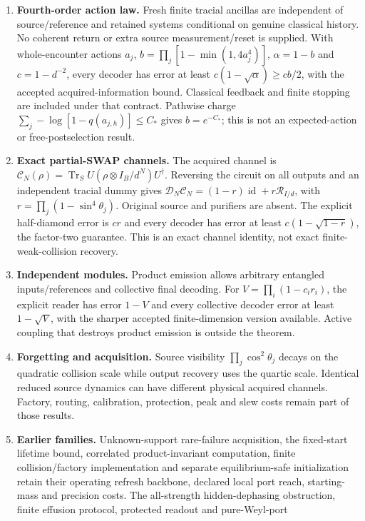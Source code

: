 \documentclass[11pt]{article}
\newcommand{\Tr}{\operatorname{Tr}}
\newcommand{\id}{\operatorname{id}}
\begin{document}
\begin{enumerate}
\item \textbf{Fourth-order action law.} Fresh finite tracial ancillas are
independent of source/reference and retained systems conditional on genuine
classical history. No coherent return or extra source measurement/reset is
supplied. With whole-encounter actions $a_j$,
$b=\prod_j[1-\min(1,4a_j^4)]$, $\alpha=1-b$ and $c=1-d^{-2}$,
every decoder has error at least $c(1-\sqrt\alpha)\ge cb/2$, with the accepted
acquired-information bound. Classical feedback and finite stopping are included
under that contract. Pathwise charge
$\sum_j-\log[1-q(a_{j,h})]\le C_*$ gives $b=e^{-C_*}$; this is not an
expected-action or free-postselection result.
\item \textbf{Exact partial-SWAP channels.} The acquired channel is
$\mathcal C_N(\rho)=\Tr_S U(\rho\otimes I_B/d^N)U^\dagger$.
Reversing the circuit on all outputs and an independent tracial dummy gives
$\mathcal D_N\mathcal C_N=(1-r)\id+r\mathcal R_{I/d}$, with
$r=\prod_j(1-\sin^4\theta_j)$. Original source and purifiers are absent.
The explicit half-diamond error is $cr$ and every decoder has error at least
$c(1-\sqrt{1-r})$, the factor-two guarantee. This is an exact channel identity,
not exact finite-weak-collision recovery.
\item \textbf{Independent modules.} Product emission allows arbitrary
entangled inputs/references and collective final decoding. For
$V=\prod_i(1-c_i r_i)$, the explicit reader has error $1-V$ and every
collective decoder error at least $1-\sqrt V$, with the sharper accepted
finite-dimension version available. Active coupling that destroys product
emission is outside the theorem.
\item \textbf{Forgetting and acquisition.} Source visibility
$\prod_j\cos^2\theta_j$ decays on the quadratic collision scale while
output recovery uses the quartic scale. Identical reduced source dynamics can
have different physical acquired channels. Factory, routing, calibration,
protection, peak and slew costs remain part of those results.
\item \textbf{Earlier families.} Unknown-support rare-failure acquisition,
the fixed-start lifetime bound, correlated product-invariant computation,
finite collision/factory implementation and separate equilibrium-safe
initialization retain their operating refresh backbone, declared local port
reach, starting-mass and precision costs. The all-strength hidden-dephasing
obstruction, finite effusion protocol, protected readout and pure-Weyl-port

\end{enumerate}
\end{document}
